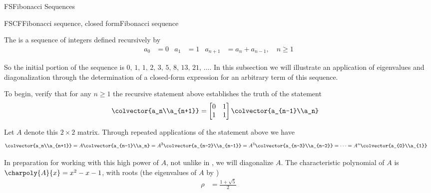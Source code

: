 \begin{subsect}{FS}{Fibonacci Sequences}
%
\begin{example}{FSCF}{Fibonacci sequence, closed form}{Fibonacci sequence}
%
\begin{para}The  is a sequence of integers defined recursively by
%
\begin{align*}
a_0&=0
&
a_1&=1
&
a_{n+1}&=a_n+a_{n-1},\quad n\geq 1
\end{align*}\end{para}
%
\begin{para}So the initial portion of the sequence is $0,\,1,\,1,\,2,\,3,\,5,\,8,\,13,\,21,\,\ldots$.  In this subsection we will illustrate an application of eigenvalues and diagonalization through the determination of a closed-form expression for an arbitrary term of this sequence.\end{para}
%
\begin{para}To begin, verify that for any $n\geq 1$ the recursive statement above establishes the truth of the statement
%
\begin{align*}
\colvector{a_n\\a_{n+1}}
&=
\begin{bmatrix}0&1\\1&1\end{bmatrix}
\colvector{a_{n-1}\\a_n}
\end{align*}
\end{para}
%
\begin{para}Let $A$ denote this $2\times 2$ matrix.  Through repeated applications of the statement above we have
%
\begin{align*}
\colvector{a_n\\a_{n+1}}
&
=A\colvector{a_{n-1}\\a_n}
=A^2\colvector{a_{n-2}\\a_{n-1}}
=A^3\colvector{a_{n-3}\\a_{n-2}}
=\cdots
=A^n\colvector{a_{0}\\a_{1}}
\end{align*}\end{para}
%
\begin{para}In preparation for working with this high power of $A$, not unlike in , we will diagonalize $A$.  The characteristic polynomial of $A$ is $\charpoly{A}{x}=x^2-x-1$, with roots  (the eigenvalues of $A$ by )
%
\begin{align*}
\rho&=\frac{1+\sqrt{5}}{2}

\end{align*}
\end{para}
\end{example}
\end{subsect}
